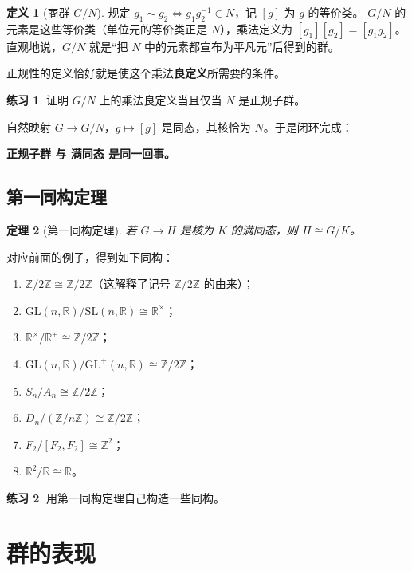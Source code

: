 \documentclass[11pt,a4paper]{article}
\theoremstyle{definition}
\newtheorem{definition}{定义}[section]
\newtheorem{exercise}{练习}
\theoremstyle{plain}
\newtheorem{theorem}[definition]{定理}
\theoremstyle{remark}
\newcommand{\Z}{\mathbb{Z}}
\newcommand{\R}{\mathbb{R}}
\newcommand{\GL}{\mathrm{GL}}
\newcommand{\SL}{\mathrm{SL}}
\begin{document}
\begin{definition}[商群 $G/N$]
规定 $g_1\sim g_2\iff g_1g_2^{-1}\in N$，记 $[g]$ 为 $g$ 的等价类。
$G/N$ 的元素是这些等价类（单位元的等价类正是 $N$），乘法定义为 $[g_1][g_2]=[g_1g_2]$。
直观地说，$G/N$ 就是“把 $N$ 中的元素都宣布为平凡元”后得到的群。
\end{definition}
正规性的定义恰好就是使这个乘法\textbf{良定义}所需要的条件。

\begin{exercise}
证明 $G/N$ 上的乘法良定义当且仅当 $N$ 是正规子群。
\end{exercise}

自然映射 $G\to G/N$，$g\mapsto[g]$ 是同态，其核恰为 $N$。于是闭环完成：
\begin{center}
\textbf{正规子群 与 满同态 是同一回事。}
\end{center}

\subsection{第一同构定理}

\begin{theorem}[第一同构定理]
若 $G\to H$ 是核为 $K$ 的满同态，则 $H\cong G/K$。
\end{theorem}

对应前面的例子，得到如下同构：
\begin{enumerate}[nosep]
  \item $\Z/2\Z\cong\Z/2\Z$（这解释了记号 $\Z/2\Z$ 的由来）；
  \item $\GL(n,\R)/\SL(n,\R)\cong\R^{\times}$；
  \item $\R^{\times}/\R^{+}\cong\Z/2\Z$；
  \item $\GL(n,\R)/\GL^{+}(n,\R)\cong\Z/2\Z$；
  \item $S_n/A_n\cong\Z/2\Z$；
  \item $D_n/(\Z/n\Z)\cong\Z/2\Z$；
  \item $F_2/[F_2,F_2]\cong\Z^2$；
  \item $\R^2/\R\cong\R$。
\end{enumerate}

\begin{exercise}
用第一同构定理自己构造一些同构。
\end{exercise}

\section{群的表现}\label{sec:pres}
\end{document}
